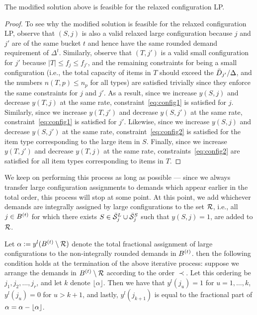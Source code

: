 \begin{claim} \label{cl:swap1}
The modified solution above is feasible for the relaxed configuration LP.
\end{claim}
\begin{proof}
To see why the modified solution is feasible for the relaxed configuration LP, observe that $(S,j)$ is also a valid relaxed large configuration because $j$ and $j'$ are of the same bucket $t$ and hence have the same rounded demand requirement of $\Delta^t$. Similarly, observe that $(T,j')$ is a valid small configuration for $j'$ because $|T| \leq f_{j} \leq f_{j'}$, and the remaining constraints for being a small configuration (i.e., the total capacity of items in $T$ should exceed the ${\bar D}_{j'}/\Delta$, and the numbers $n(T,p) \leq n_p$ for all types) are satisfied trivially since they enforce the same constraints for $j$ and $j'$. As a result, since we increase $y(S,j)$ and decrease $y(T,j)$ at the same rate, constraint~\cref{eq:config1} is satisfied for $j$. Similarly, since we increase $y(T,j')$ and decrease $y(S,j')$ at the same rate, constraint~\cref{eq:config1} is satisfied for $j'$. Likewise, since we increase $y(S,j)$ and decrease $y(S,j')$ at the same rate, constraint~\cref{eq:config2} is satisfied for the item type corresponding to the large item in $S$. Finally, since we increase $y(T,j')$ and decrease $y(T,j)$ at the same rate, constraints~\cref{eq:config2} are satisfied for all item types corresponding to items in $T$.
\end{proof}

We keep on performing this process as long as possible --- since we always transfer large configuration assignments to demands which appear earlier in the total order, this process will stop at some point. At this point, we add whichever demands are integrally assigned by large configurations to the set ${\cal R}$, i.e., all $j \in B^{(t)}$ for which there exists $S \in \bar{\cal S}^L_j \cup \bar{\cal S}^S_j$ such that $y(S,j) = 1$, are added to ${\cal R}$.

\begin{claim} \label{cl:step3a}
 Let $\alpha := y^l(B^{(t)} \setminus {\cal R})$ denote the total fractional assignment of large configurations to the non-integrally rounded demands in $B^{(t)}$. then the following condition holds at the termination of the above iterative process: suppose we arrange the demands in $B^{(t)} \setminus {\cal R}$ according to the order $\prec$. Let this ordering be $j_1, j_2, \ldots, j_r$, and let $k$ denote $\lfloor \alpha \rfloor$. Then we have that $y^l(j_u) = 1$ for $u=1, \ldots, k$, $y^l(j_u) = 0$ for $u > k+1$, and lastly, $y^l(j_{k+1})$ is equal to the fractional part of $\alpha = \alpha - \lfloor\alpha\rfloor$.
 \end{claim}

